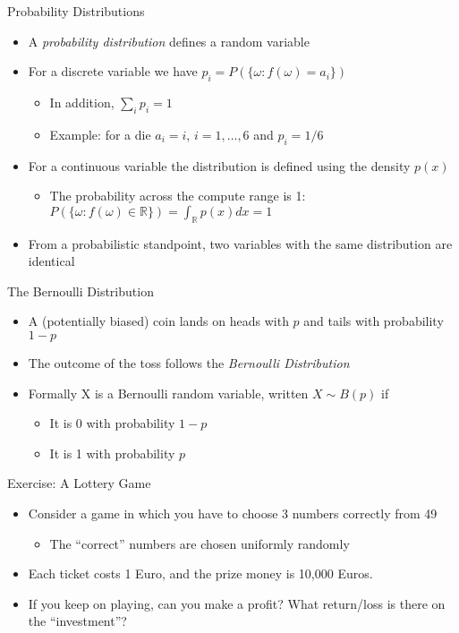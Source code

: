 \documentclass{beamer}
\begin{document}
\begin{frame}{Probability Distributions} 
\begin{itemize}
\item A \emph{probability distribution} defines a random variable 
\item For a discrete variable we have $p_i = P(\{\omega: f(\omega) = a_i\})$
\begin{itemize}
\item In addition, $\sum_i p_i  = 1$
\item Example: for a die $a_i = i$, $i=1,\ldots, 6$ and $p_i = 1/6$
\end{itemize}
\item For a continuous variable the distribution is defined using the density $p(x)$
\begin{itemize}
\item The probability across the compute range is 1: $P(\{\omega: f(\omega) \in \mathbb{R}\}) = \int_\mathbb{R} p(x) dx = 1$ 
\end{itemize}
\item From a probabilistic standpoint, two variables with the same distribution are identical 
\end{itemize}
\end{frame}

\begin{frame}{The Bernoulli Distribution}
\begin{itemize}
 \item A (potentially biased) coin lands on heads with $p$ and tails with probability $1-p$
\item The outcome of the toss follows the \emph{Bernoulli Distribution} 
\item Formally X is a Bernoulli random variable, written $X \sim B(p)$ if 
\begin{itemize}
\item It is 0 with probability $1-p$ 
\item It is 1 with probability $p$ 
\end{itemize} 
\end{itemize}
\end{frame}


\begin{frame}{Exercise: A Lottery Game}  
\begin{itemize} 
\item Consider a game in which you have to choose 3 numbers correctly from 49 
\begin{itemize}
\item The ``correct'' numbers are chosen uniformly randomly 
\end{itemize}
\item Each ticket costs 1 Euro, and the prize money is 10,000 Euros. 
\item If you keep on playing, can you make a profit? What return/loss is there on the ``investment''?
\end{itemize}
\end{frame}
\end{document}
